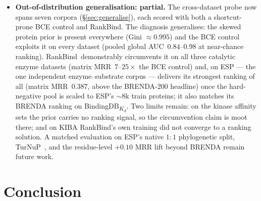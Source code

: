 \documentclass[11pt,a4paper]{article}
\newcommand{\method}{RankBind\xspace}
\newcommand{\gauc}{global AUC}
\newcommand{\matmrr}{matrix MRR}
\begin{document}
\begin{itemize}[leftmargin=*,itemsep=0pt,topsep=1pt]
        contribution is that this signal is \emph{removed} through the
        architecture (AUC drops to $0.68$); nevertheless, absolute
        pooled metrics on this corpus should be read with the decoy
        construction in mind, and generalisation to independent
        enzyme--substrate and DTI benchmarks (next item) is the
        cleanest control.
  \item \textbf{Out-of-distribution generalisation: partial.} The
        cross-dataset probe now spans seven corpora
        (\S\ref{sec:generalise}), each scored with both a shortcut-prone
        BCE control and \method. The diagnosis generalises: the skewed
        protein prior is present everywhere (Gini $\approx 0.995$) and
        the BCE control exploits it on every dataset (pooled \gauc\
        $0.84$--$0.98$ at near-chance ranking). \method\ demonstrably
        circumvents it on all three catalytic enzyme datasets
        (\matmrr\ $7$--$25\times$ the BCE control) and, on ESP --- the
        one independent enzyme--substrate corpus --- delivers its
        strongest ranking of all (\matmrr\ $0.387$, above the BRENDA-200
        headline) once the hard-negative pool is scaled to ESP's
        $\sim\!8$k train proteins; it also matches its BRENDA ranking on
        BindingDB\textsubscript{$K_d$}. Two limits remain: on the kinase
        affinity sets the prior carries no ranking signal, so the
        circumvention claim is moot there; and on KIBA \method's own
        training did not converge to a ranking solution. A matched
        evaluation on ESP's native $1{:}1$ phylogenetic split,
        TurNuP~\citep{kroll2023turnup}, and the
        residue-level $+0.10$ MRR lift beyond BRENDA remain future work.
\end{itemize}

\section{Conclusion}
\label{sec:conclusion}
\end{document}
